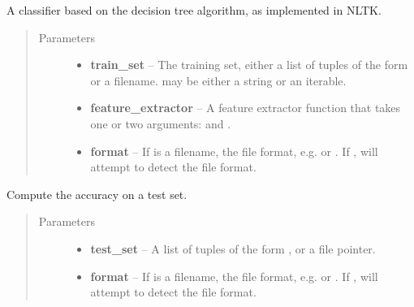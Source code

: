 \documentclass[letterpaper,10pt,english]{sphinxmanual}
\begin{document}
\begin{fulllineitems}
\label{api_reference:textblob.classifiers.DecisionTreeClassifier}
A classifier based on the decision tree algorithm, as implemented in
NLTK.
\begin{quote}\begin{description}
\item[{Parameters}] \leavevmode\begin{itemize}
\item {} 
\textbf{train\_set} -- The training set, either a list of tuples of the form
 or a filename.  may be either
a string or an iterable.

\item {} 
\textbf{feature\_extractor} -- A feature extractor function that takes one or
two arguments:  and .

\item {} 
\textbf{format} -- If  is a filename, the file format, e.g.
 or . If , will attempt to detect the
file format.

\end{itemize}

\end{description}\end{quote}


\begin{fulllineitems}
\label{api_reference:textblob.classifiers.DecisionTreeClassifier.accuracy}
Compute the accuracy on a test set.
\begin{quote}\begin{description}
\item[{Parameters}] \leavevmode\begin{itemize}
\item {} 
\textbf{test\_set} -- A list of tuples of the form , or a
file pointer.

\item {} 
\textbf{format} -- If  is a filename, the file format, e.g.
 or . If , will attempt to detect the
file format.


\end{itemize}
\end{description}
\end{quote}
\end{fulllineitems}
\end{fulllineitems}
\end{document}
